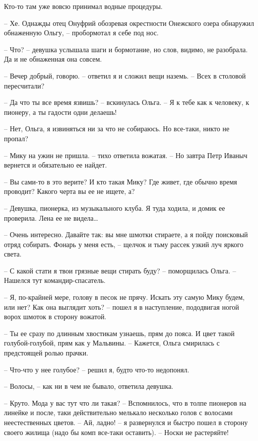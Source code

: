 \documentclass[a4paper]{book}
\begin{document}
Кто-то там уже вовсю принимал водные процедуры. 

-- Хе. Однажды отец Онуфрий обозревая окрестности Онежского озера обнаружил обнаженную Ольгу, -- пробормотал я себе под нос.

-- Что? -- девушка услышала шаги и бормотание, но слов, видимо, не разобрала. Да и не обнаженная она совсем.

-- Вечер добрый, говорю. -- ответил я и сложил вещи наземь. -- Всех в столовой пересчитали?

-- Да что ты все время язвишь? -- вскинулась Ольга. -- Я к тебе как к человеку, к пионеру, а ты гадости одни делаешь!

-- Нет, Ольга, я извиняться ни за что не собираюсь. Но все-таки, никто не пропал?

-- Мику на ужин не пришла. -- тихо ответила вожатая. -- Но завтра Петр Иваныч вернется и обязательно ее найдет. 

-- Вы сами-то в это верите? И кто такая Мику? Где живет, где обычно время проводит? Какого черта вы ее не ищете, а?

-- Девушка, пионерка, из музыкального клуба. Я туда ходила, и домик ее проверила. Лена ее не видела\ldots

-- Очень интересно. Давайте так: вы мне шмотки стираете, а я пойду поисковый отряд собирать. Фонарь у меня есть, -- щелчок и тьму рассек узкий луч яркого света.

-- С какой стати я твои грязные вещи стирать буду? -- поморщилась Ольга. -- Нашелся тут командир-спасатель. 

-- Я, по-крайней мере, голову в песок не прячу. Искать эту самую Мику будем, или нет? Как она выглядит хоть? -- пошел я в наступление, пододвигая ногой ворох шмоток в сторону вожатой.

-- Ты ее сразу по длинным хвостикам узнаешь, прям до пояса. И цвет такой голубой-голубой, прям как у Мальвины. -- Кажется, Ольга смирилась с предстоящей ролью прачки.

-- Что-что у нее голубое? -- решил я, будто что-то недопонял.

-- Волосы, -- как ни в чем не бывало, ответила девушка.

-- Круто. Мода у вас тут что ли такая? -- Вспомнилось, что в толпе пионеров на линейке и после, таки действительно мелькало несколько голов с волосами неестественных цветов. -- Ай, ладно! -- я развернулся и быстро пошел в сторону своего жилища (надо бы комп все-таки оставить). -- Носки не растеряйте!
\end{document}
